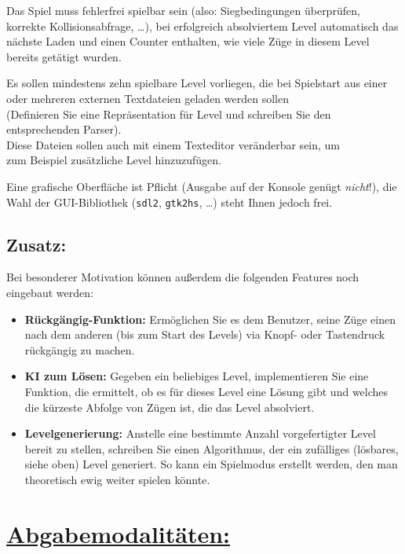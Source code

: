 \documentclass[10pt,a4paper]{article}
\begin{document}
Das Spiel muss fehlerfrei spielbar sein (also: Siegbedingungen überprüfen, korrekte Kollisionsabfrage, \dots), bei erfolgreich absolviertem Level automatisch das nächste Laden und einen Counter enthalten, wie viele Züge in diesem Level bereits getätigt wurden.\bigskip

Es sollen mindestens zehn spielbare Level vorliegen, die bei Spielstart aus einer oder mehreren externen Textdateien geladen werden sollen\\ (Definieren Sie eine Repräsentation für Level und schreiben Sie den \\entsprechenden Parser).\\
Diese Dateien sollen auch mit einem Texteditor veränderbar sein, um\\ zum Beispiel zusätzliche Level hinzuzufügen.\bigskip
 
Eine grafische Oberfläche ist Pflicht (Ausgabe auf der Konsole  genügt \emph{nicht}!), die Wahl der GUI-Bibliothek (\texttt{sdl2}, \texttt{gtk2hs}, \dots) steht Ihnen jedoch frei. 

\subsection*{Zusatz:}

Bei besonderer Motivation können außerdem die folgenden Features noch eingebaut werden:
 
\begin{itemize}
\item \textbf{Rückgängig-Funktion:} Ermöglichen Sie es dem Benutzer, seine Züge einen nach dem anderen (bis zum Start des Levels) via Knopf- oder Tastendruck rückgängig zu machen.

\item \textbf{KI zum Lösen:} Gegeben ein beliebiges Level, implementieren Sie eine Funktion, die ermittelt, ob es für dieses Level eine Lösung gibt und welches die kürzeste Abfolge von Zügen ist, die das Level absolviert.

\item \textbf{Levelgenerierung:} Anstelle eine bestimmte Anzahl vorgefertigter Level bereit zu stellen, schreiben Sie einen Algorithmus, der ein zufälliges (lösbares, siehe oben) Level generiert. So kann ein Spielmodus erstellt werden, den man theoretisch ewig weiter spielen könnte.
\end{itemize}

\section*{\underline{Abgabemodalitäten:}}
\end{document}
